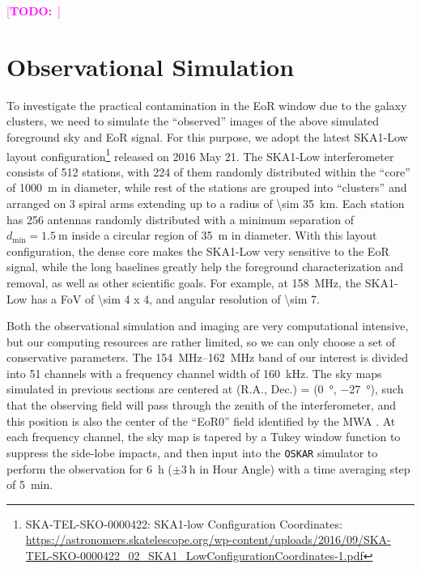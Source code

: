 \documentclass[modern]{aastex62}
\newcommand{\R}[1]{\mathrm{#1}}
\newcommand{\TODO}[1]{\textcolor{magenta}{[\textbf{TODO:}~\uuline{#1}]}}
\begin{document}
\TODO{figures ...}


\section{Observational Simulation}
\label{sec:obs-simu}

To investigate the practical contamination in the EoR window due to the
galaxy clusters, we need to simulate the \enquote{observed} images of
the above simulated foreground sky and EoR signal.
For this purpose,
we adopt the latest SKA1-Low layout configuration\footnote{%
  SKA-TEL-SKO-0000422: SKA1-low Configuration Coordinates: \url{https://astronomers.skatelescope.org/wp-content/uploads/2016/09/SKA-TEL-SKO-0000422_02_SKA1_LowConfigurationCoordinates-1.pdf}}
released on 2016 May 21.
The SKA1-Low interferometer consists of 512 stations, with 224 of them
randomly distributed within the \enquote{core} of \SI{1000}{\meter} in
diameter, while rest of the stations are grouped into \enquote{clusters}
and arranged on 3 spiral arms extending up to a radius of
\SI{\sim 35}{\kilo\meter}.
Each station has 256 antennas randomly distributed with a minimum separation
of $d_{\R{min}} = \SI{1.5}{\meter}$ inside a circular region of
\SI{35}{\meter} in diameter.
With this layout configuration, the dense core makes the SKA1-Low very
sensitive to the EoR signal, while the long baselines greatly help the
foreground characterization and removal, as well as other scientific goals.
For example, at \SI{158}{\MHz}, the SKA1-Low has a FoV of
\SI{\sim 4 x 4}{\deg}, and angular resolution of \SI{\sim 7}{\arcsec}.

Both the observational simulation and imaging are very computational
intensive, but our computing resources are rather limited, so we can
only choose a set of conservative parameters.
The \SIrange{154}{162}{\MHz} band of our interest is divided into 51
channels with a frequency channel width of \SI{160}{\kilo\hertz}.
The sky maps simulated in previous sections are centered at (R.A., Dec.)
= (\SI{0}{\degree}, \SI{-27}{\degree}), such that the observing field
will pass through the zenith of the interferometer, and this position
is also the center of the \enquote{EoR0} field identified by the MWA
\citep{beardsley2016}.
At each frequency channel, the sky map is tapered by a Tukey window
function to suppress the side-lobe impacts, and then input into the
\texttt{OSKAR} simulator \citep{mort2010} to perform the observation
for \SI{6}{\hour} ($\pm \SI{3}{\hour}$ in Hour Angle) with a time
averaging step of \SI{5}{\minute}.
\end{document}
